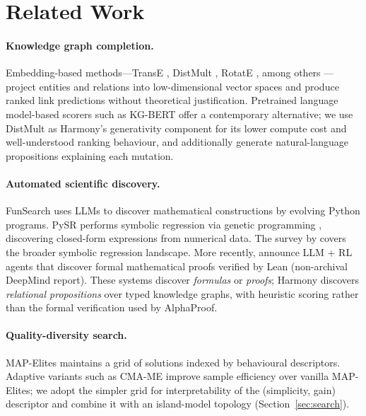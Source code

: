 \section{Related Work}\label{sec:related}

\paragraph{Knowledge graph completion.}
Embedding-based methods---TransE \citep{bordes2013transe}, DistMult
\citep{yang2015distmult}, RotatE \citep{sun2019rotate}, among others
\citep{ji2021kgsurvey}---project entities and relations into low-dimensional
vector spaces and produce ranked link predictions without theoretical
justification.  Pretrained language model-based scorers such as KG-BERT
\citep{yao2019kgbert} offer a contemporary alternative; we use DistMult
as Harmony's generativity component for its lower compute cost and
well-understood ranking behaviour, and additionally generate
natural-language propositions explaining each mutation.

\paragraph{Automated scientific discovery.}
FunSearch \citep{romeraparedes2024funsearch} uses LLMs to discover mathematical
constructions by evolving Python programs.  PySR
\citep{cranmer2023pysr} performs symbolic regression via genetic programming
\citep{koza1992gp}, discovering closed-form expressions from numerical data.
The survey by \citet{makke2024sr_survey} covers the broader symbolic regression
landscape.  More recently, \citet{alphaproof2024} announce LLM + RL agents that
discover formal mathematical proofs verified by Lean (non-archival
DeepMind report).
These systems discover \emph{formulas} or \emph{proofs}; Harmony discovers
\emph{relational propositions} over typed knowledge graphs, with heuristic
scoring rather than the formal verification used by AlphaProof.

\paragraph{Quality-diversity search.}
MAP-Elites \citep{mouret2015mapelites} maintains a grid of solutions indexed by
behavioural descriptors.  Adaptive variants such as CMA-ME
\citep{fontaine2020cmame} improve sample efficiency over vanilla MAP-Elites;
we adopt the simpler grid for interpretability of the (simplicity, gain)
descriptor and combine it with an island-model
\citep{whitley1997island} topology (Section~\ref{sec:search}).

